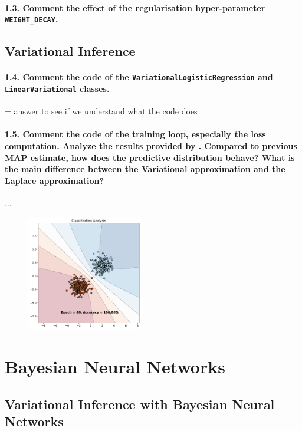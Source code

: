 \paragraph{1.3. Comment the effect of the regularisation hyper-parameter  \texttt{WEIGHT\_DECAY}.}



\subsection{Variational Inference}
\paragraph{1.4. Comment the code of the \texttt{VariationalLogisticRegression} and \texttt{LinearVariational} classes.}
= answer to see if we understand what the code does

\paragraph{1.5. Comment the code of the training loop, especially the loss computation. Analyze the results provided by . Compared to previous MAP estimate, how does the predictive distribution behave? What is the main difference between the Variational approximation and the Laplace approximation?}

...

\begin{figure}[H]
    \centering
    \includegraphics[width=0.45\textwidth]{logreg_variational.pdf}
    \caption{}
    \label{fig:logreg_variational}
\end{figure}


\section{Bayesian Neural Networks}
\subsection{Variational Inference with Bayesian Neural Networks}
